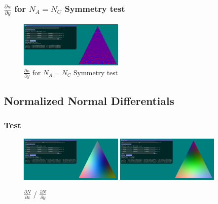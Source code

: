 \documentclass[12pt]{article}
\newcommand{\oneimgwidth}{0.45}
\newcommand{\dndy}{\frac{\partial n}{\partial y}}
\newcommand{\dnndx}{\frac{\partial N}{\partial x}}
\newcommand{\dnndy}{\frac{\partial N}{\partial y}}
\begin{document}
\FloatBarrier

\subsubsection{$\dndy$ for $N_A = N_C$ Symmetry test}

\begin{figure}[htbp] 
	\centering
	\includegraphics[width=\oneimgwidth\textwidth]{dn/dndy_na_nc_equal_symetry.png}
	\caption{$\dndy$ for $N_A = N_C$ Symmetry test}
	\label{fig:dndx}
\end{figure}

\FloatBarrier

\subsection{Normalized Normal Differentials}

\subsubsection{Test}

\begin{figure}[htbp] 
	\centering
	\includegraphics[width=\oneimgwidth\textwidth]{dnn/dnndx.png}
	\includegraphics[width=\oneimgwidth\textwidth]{dnn/dnndy.png}
	\caption{$\dnndx$ / $\dnndy$}
	\label{fig:dndx}
\end{figure}
\end{document}
